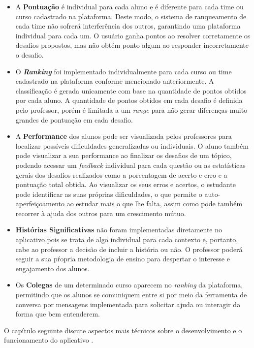 \begin{itemize}
    \item A \textbf{Pontuação} é individual para cada aluno e é diferente para cada time ou curso cadastrado na plataforma. Deste modo, o sistema de ranqueamento de cada time não sofrerá interferência dos outros, garantindo uma plataforma individual para cada um. O usuário ganha pontos ao resolver corretamente os desafios propostos, mas não obtém ponto algum ao responder incorretamente o desafio.
    \item O \textbf{\textit{Ranking}} foi implementado individualmente para cada curso ou time cadastrado na plataforma conforme mencionado anteriormente. A classificação é gerada unicamente com base na quantidade de pontos obtidos por cada aluno. A quantidade de pontos obtidos em cada desafio é definida pelo professor, porém é limitada a um \textit{range} para não gerar diferenças muito grandes de pontuação em cada desafio.
    \item A \textbf{Performance} dos alunos pode ser visualizada pelos professores para localizar possíveis dificuldades generalizadas ou individuais. O aluno também pode visualizar a sua performance ao finalizar os desafios de um tópico, podendo acessar um \textit{feedback} individual para cada questão ou as estatísticas gerais dos desafios realizados como a porcentagem de acerto e erro e a pontuação total obtida. Ao visualizar os seus erros e acertos, o estudante pode identificar as suas próprias dificuldades, o que permite o auto-aperfeiçoamento ao estudar mais o que lhe falta, assim como pode também recorrer à ajuda dos outros para um crescimento mútuo.
    \item \textbf{Histórias Significativas} não foram implementadas diretamente no aplicativo pois se trata de algo individual para cada contexto e, portanto, cabe ao professor a decisão de incluir a história ou não. O professor poderá seguir a sua pŕopria metodologia de ensino para despertar o interesse e engajamento dos alunos.
    \item Os \textbf{Colegas} de um determinado curso aparecem no \textit{ranking} da plataforma, permitindo que os alunos se comuniquem entre si por meio da ferramenta de conversa por mensagens implementada para solicitar ajuda ou interagir da forma que bem entenderem.
\end{itemize}

O capítulo seguinte discute aspectos mais técnicos sobre o desenvolvimento e o funcionamento do aplicativo \appName.
